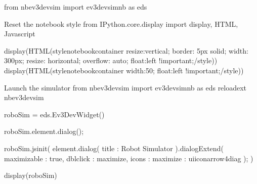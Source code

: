 \documentclass[letterpaper,10pt,english]{sphinxmanual}
\begin{document}
{{
\begin{sphinxVerbatim}[commandchars=\\\{\}]
\llap{\color{nbsphinxin}[ ]:\,\hspace{\fboxrule}\hspace{\fboxsep}}from nbev3devsim import ev3devsim\PYGZus{}nb as eds

\PYGZsh{}Reset the notebook style
from IPython.core.display import display, HTML, Javascript

\PYGZsh{}display(HTML(\PYGZdq{}\PYGZlt{}style\PYGZgt{}\PYGZsh{}notebook\PYGZhy{}container \PYGZob{} resize:vertical; border: 5px solid;  width: 300px; resize: horizontal; overflow: auto; float:left !important;\PYGZcb{}\PYGZlt{}/style\PYGZgt{}\PYGZdq{}))
display(HTML(\PYGZdq{}\PYGZlt{}style\PYGZgt{}\PYGZsh{}notebook\PYGZhy{}container \PYGZob{} width:50\PYGZpc{}; float:left !important;\PYGZcb{}\PYGZlt{}/style\PYGZgt{}\PYGZdq{}))

\PYGZsh{}Launch the simulator
from nbev3devsim import ev3devsim\PYGZus{}nb as eds
\PYGZpc{}reload\PYGZus{}ext nbev3devsim

roboSim = eds.Ev3DevWidget()

roboSim.element.dialog();


roboSim.js\PYGZus{}init(\PYGZdq{}\PYGZdq{}\PYGZdq{}
element.dialog(\PYGZob{} \PYGZdq{}title\PYGZdq{} : \PYGZdq{}Robot Simulator\PYGZdq{} \PYGZcb{}).dialogExtend(\PYGZob{}
        \PYGZdq{}maximizable\PYGZdq{} : true,
        \PYGZdq{}dblclick\PYGZdq{} : \PYGZdq{}maximize\PYGZdq{},
        \PYGZdq{}icons\PYGZdq{} : \PYGZob{} \PYGZdq{}maximize\PYGZdq{} : \PYGZdq{}ui\PYGZhy{}icon\PYGZhy{}arrow\PYGZhy{}4\PYGZhy{}diag\PYGZdq{} \PYGZcb{}\PYGZcb{});
\PYGZdq{}\PYGZdq{}\PYGZdq{})

display(roboSim)
\end{sphinxVerbatim}
}

{
\begin{sphinxVerbatim}[commandchars=\\\{\}]
\llap{\color{nbsphinxin}[ ]:\,\hspace{\fboxrule}\hspace{\fboxsep}}
   
\end{sphinxVerbatim}
}

}
\end{document}
